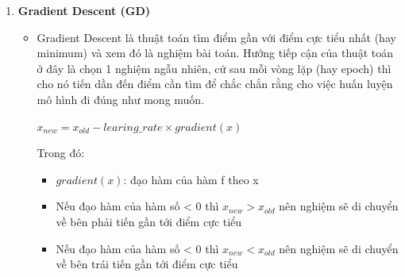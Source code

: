 \begin{enumerate}
    \item \textbf{Gradient Descent (GD)}
    \begin{itemize}
        \item Gradient Descent là thuật toán tìm điểm gần với điểm cực tiểu nhất (hay minimum) và xem đó là nghiệm bài toán. Hướng tiếp cận của thuật toán ở đây là chọn 1 nghiệm ngẫu nhiên, cứ sau mỗi vòng lặp (hay epoch) thì cho nó tiến dần đến điểm cần tìm để chắc chắn rằng cho việc huấn luyện mô hình đi đúng như mong muốn.
            \begin{center}
                \large $x_{new} = x_{old} - learing\_rate \times gradient(x)$
            \end{center}
        Trong đó:
        \begin{itemize}
        \item $gradient(x)$: đạo hàm của hàm f theo x
        \item Nếu đạo hàm của hàm số < 0 thì $x_{new} > x_{old}$ nên nghiệm sẽ di chuyển về bên phải tiến gần tới điểm cực tiểu
        \item Nếu đạo hàm của hàm số < 0 thì $x_{new} < x_{old}$ nên nghiệm sẽ di chuyển về bên trái tiến gần tới điểm cực tiểu
        \end{itemize}
        

\end{itemize}
\end{enumerate}
